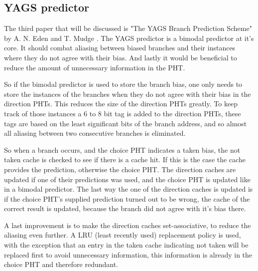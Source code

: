 \subsection{YAGS predictor}
\label{ssec:yags}
The third paper that will be discussed is "The YAGS Branch Prediction Scheme" by A. N. Eden and T. Mudge \cite{yags}.
The YAGS predictor is a bimodal predictor at it's core.
It should combat aliasing between biased branches and their instances where they do not agree with their bias.
And lastly it would be beneficial to reduce the amount of unnecessary information in the PHT.

So if the bimodal predictor is used to store the branch bias, one only needs to store the instances of the branches when they do not agree with their bias in the direction PHTs.
This reduces the size of the direction PHTs greatly.
To keep track of those instances a 6 to 8 bit tag is added to the direction PHTs, these tags are based on the least significant bits of the branch address, and so almost all aliasing between two consecutive branches is eliminated.

So when a branch occurs, and the choice PHT indicates a taken bias, the not taken cache is checked to see if there is a cache hit.
If this is the case the cache provides the prediction, otherwise the choice PHT.
The direction caches are updated if one of their predictions was used, and the choice PHT is updated like in a bimodal predictor.
The last way the one of the direction caches is updated is if the choice PHT's supplied prediction turned out to be wrong, the cache of the correct result is updated, because the branch did not agree with it's bias there.

A last improvement is to make the direction caches set-associative, to reduce the aliasing even further.
A LRU (least recently used) replacement policy is used, with the exception that an entry in the taken cache indicating not taken will be replaced first to avoid unnecessary information, this information is already in the choice PHT and therefore redundant.
